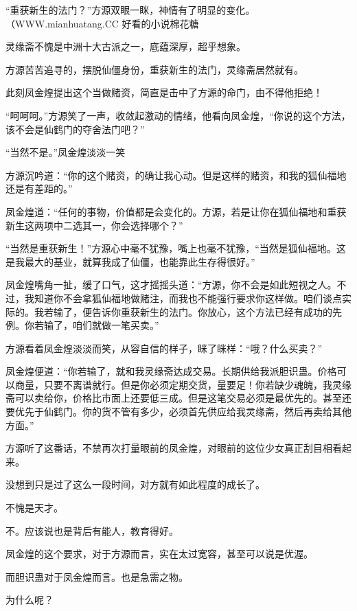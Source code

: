 
\begin{this_body}

“重获新生的法门？”方源双眼一眯，神情有了明显的变化。（WWW.mianhuatang.CC 好看的小说棉花糖

灵缘斋不愧是中洲十大古派之一，底蕴深厚，超乎想象。

方源苦苦追寻的，摆脱仙僵身份，重获新生的法门，灵缘斋居然就有。

此刻凤金煌提出这个当做赌资，简直是击中了方源的命门，由不得他拒绝！

“呵呵呵。”方源笑了一声，收敛起激动的情绪，他看向凤金煌，“你说的这个方法，该不会是仙鹤门的夺舍法门吧？”

“当然不是。”凤金煌淡淡一笑

方源沉吟道：“你的这个赌资，的确让我心动。但是这样的赌资，和我的狐仙福地还是有差距的。”

凤金煌道：“任何的事物，价值都是会变化的。方源，若是让你在狐仙福地和重获新生这两项中二选其一，你会选择哪个？”

“当然是重获新生！”方源心中毫不犹豫，嘴上也毫不犹豫，“当然是狐仙福地。这是我最大的基业，就算我成了仙僵，也能靠此生存得很好。”

凤金煌嘴角一扯，缓了口气，这才摇摇头道：“方源，你不会是如此短视之人。不过，我知道你不会拿狐仙福地做赌注，而我也不能强行要求你这样做。咱们谈点实际的。我若输了，便告诉你重获新生的法门。你放心，这个方法已经有成功的先例。你若输了，咱们就做一笔买卖。”

方源看着凤金煌淡淡而笑，从容自信的样子，眯了眯样：“哦？什么买卖？”

凤金煌便道：“你若输了，就和我灵缘斋达成交易。长期供给我派胆识蛊。价格可以商量，只要不离谱就行。但是你必须定期交货，量要足！你若缺少魂魄，我灵缘斋可以卖给你，价格比市面上还要低三成。但是这笔交易必须是最优先的。甚至还要优先于仙鹤门。你的货不管有多少，必须首先供应给我灵缘斋，然后再卖给其他方面。”

方源听了这番话，不禁再次打量眼前的凤金煌，对眼前的这位少女真正刮目相看起来。

没想到只是过了这么一段时间，对方就有如此程度的成长了。

不愧是天才。

不。应该说也是背后有能人，教育得好。

凤金煌的这个要求，对于方源而言，实在太过宽容，甚至可以说是优渥。

而胆识蛊对于凤金煌而言。也是急需之物。

为什么呢？


\end{this_body}
